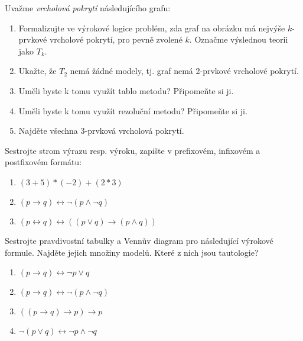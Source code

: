 \documentclass[a4paper,12pt]{article}
\begin{document}
\medskip\begin{problem}
Uvažme \emph{vrcholová pokrytí} následujícího grafu:

\begin{center}
\end{center}

\begin{enumerate}
    \item Formalizujte ve výrokové logice problém, zda graf na obrázku má nejvýše $k$-prvkové vrcholové pokrytí, pro pevně zvolené $k$. Označme výslednou teorii jako $T_k$.
    \item Ukažte, že $T_2$ nemá žádné modely, tj. graf nemá 2-prvkové vrcholové pokrytí.
    \item Uměli byste k tomu využít tablo metodu? Připomeňte si ji.
    \item Uměli byste k tomu využít rezoluční metodu? Připomeňte si ji.
    \item Najděte všechna 3-prvková vrcholová pokrytí.
\end{enumerate}
\end{problem}


\medskip\begin{problem}
    Sestrojte strom výrazu resp. výroku, zapište v prefixovém, infixovém a postfixovém formátu:
    \begin{enumerate}
        \item $(3+5)*(-2)+(2*3)$
        \item $(p \to q) \leftrightarrow \neg (p \wedge \neg q)$
        \item $(p \leftrightarrow q) \leftrightarrow ((p \vee q) \to (p \wedge q))$
    \end{enumerate}
\end{problem}


\medskip\begin{problem}
Sestrojte pravdivostní tabulky a Vennův diagram pro následující výrokové formule. Najděte jejich množiny modelů. Které z nich jsou tautologie?%
\begin{enumerate}
\item $(p \to q) \leftrightarrow \neg p \vee q$
\item $(p \to q) \leftrightarrow \neg (p \wedge \neg q)$
\item $((p\to q)\to p)\to p$
\item $\neg (p\vee q)\leftrightarrow \neg p\wedge \neg q$
\end{enumerate}
\end{problem}
\end{document}
